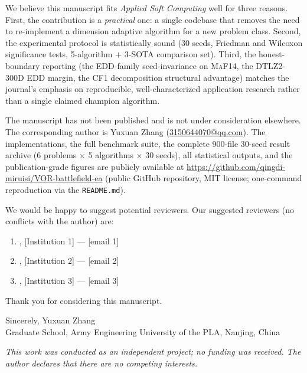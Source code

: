 \documentclass[11pt]{article}
\begin{document}
We believe this manuscript fits \emph{Applied Soft Computing} well for
three reasons. First, the contribution is a \emph{practical} one: a
single codebase that removes the need to re-implement a dimension
adaptive algorithm for a new problem class. Second, the experimental
protocol is statistically sound (30 seeds, Friedman and Wilcoxon
significance tests, 5-algorithm $+$ 3-SOTA comparison set). Third, the
honest-boundary reporting (the \textsc{EDD}-family seed-invariance on
\textsc{MaF14}, the \textsc{DTLZ2}-300D \textsc{EDD} margin, the
\textsc{CF1} decomposition structural advantage) matches the journal's
emphasis on reproducible, well-characterized application research rather
than a single claimed champion algorithm.

The manuscript has not been published and is not under consideration
elsewhere. The corresponding author is Yuxuan Zhang
(\href{mailto:3150644070@qq.com}{3150644070@qq.com}). The
implementations, the full benchmark suite, the complete 900-file
30-seed result archive (6 problems $\times$ 5 algorithms $\times$ 30
seeds), all statistical outputs, and the publication-grade figures are
publicly available at
\url{https://github.com/qingdi-miruisi/VOR-battlefield-ea}
(public GitHub repository, MIT license; one-command reproduction via
the \texttt{README.md}).

We would be happy to suggest potential reviewers. Our suggested
reviewers (no conflicts with the author) are:
\begin{enumerate}
\item [Name 1], [Institution 1] --- [email 1]
\item [Name 2], [Institution 2] --- [email 2]
\item [Name 3], [Institution 3] --- [email 3]
\end{enumerate}
\noindent
Thank you for considering this manuscript.

\vspace{1em}

Sincerely,
\vspace{1em}
Yuxuan Zhang\\
Graduate School, Army Engineering University of the PLA, Nanjing, China

\vspace{0.5em}
{\small\emph{This work was conducted as an independent project;
no funding was received. The author declares that there are no
competing interests.}}
\end{document}
